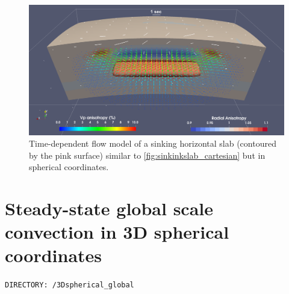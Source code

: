 \begin{figure}[ht]
    \centering
    \includegraphics[width=1.0\textwidth]{cookbooks/3Dspherical_sinkingslab3.png}
    \caption{Time-dependent flow model of a sinking horizontal slab (contoured by the pink surface) similar to \ref{fig:sinkinkslab_cartesian} but in spherical coordinates.\\
    }
    \label{fig:sinkinkslab_spherical}
\end{figure}

\vfill %

\section{Steady-state global scale convection in 3D spherical coordinates}
\label{section:cookbook_3Dspherical_global}

\texttt{DIRECTORY: /3Dspherical\_global}

